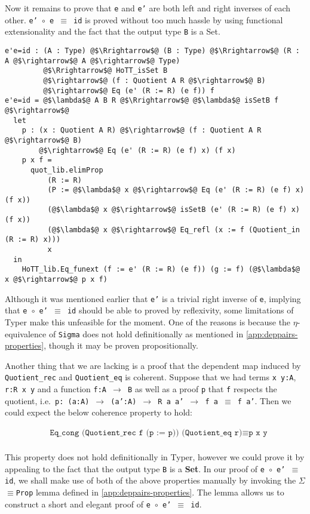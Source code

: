 \documentclass[12pt,twoside,maitrise]{dms}
\theoremstyle{definition}
\numberwithin{equation}{section}
\numberwithin{table}{chapter}
\numberwithin{figure}{chapter}
\newcommand\id[1] {\texttt{#1}}
\newcommand\fn[1] {\texttt{#1}}
\begin{document}
Now it remains to prove that \id{e} and \id{e'} are both left and right inverses
of each other. \fn{e' $\circ{}$ e $\equiv$ id} is proved without too much hassle
by using functional extensionality and the fact that the output type \id{B} is a
Set.

\begin{verbatim}
e'e=id : (A : Type) @$\Rrightarrow$@ (B : Type) @$\Rrightarrow$@ (R : A @$\rightarrow$@ A @$\rightarrow$@ Type)
         @$\Rrightarrow$@ HoTT_isSet B
         @$\rightarrow$@ (f : Quotient A R @$\rightarrow$@ B)
         @$\rightarrow$@ Eq (e' (R := R) (e f)) f
e'e=id = @$\lambda$@ A B R @$\Rrightarrow$@ @$\lambda$@ isSetB f @$\rightarrow$@
  let
    p : (x : Quotient A R) @$\rightarrow$@ (f : Quotient A R @$\rightarrow$@ B)
        @$\rightarrow$@ Eq (e' (R := R) (e f) x) (f x)
    p x f =
      quot_lib.elimProp
          (R := R)
          (P := @$\lambda$@ x @$\rightarrow$@ Eq (e' (R := R) (e f) x) (f x))
          (@$\lambda$@ x @$\rightarrow$@ isSetB (e' (R := R) (e f) x) (f x))
          (@$\lambda$@ x @$\rightarrow$@ Eq_refl (x := f (Quotient_in (R := R) x)))
          x
  in
    HoTT_lib.Eq_funext (f := e' (R := R) (e f)) (g := f) (@$\lambda$@ x @$\rightarrow$@ p x f)
\end{verbatim}

Although it was mentioned earlier that \id{e'} is a trivial right inverse of
\id{e}, implying that \fn{e $\circ{}$ e' $\equiv$ id} should be able to proved
by reflexivity, some limitations of Typer make this unfeasible for the moment.
One of the reasons is because the $\eta$-equivalence of \id{Sigma} does not hold
definitionally as mentioned in \autoref{app:deppairs-properties}, though it may
be proven propositionally.

Another thing that we are lacking is a proof that the dependent map induced by
\id{Quotient\_rec} and \id{Quotient\_eq} is coherent. Suppose that we had terms
\fn{x y:A}, \fn{r:R x y} and a function \fn{f:A $\rightarrow$ B} as well as a
proof \id{p} that \id{f} respects the quotient, i.e.\ \fn{p: (a:A) $\rightarrow$
  (a':A) $\rightarrow$ R a a' $\rightarrow$ f a $\equiv$ f a'}. Then we could
expect the below coherence property to hold:

\begin{align*}
  & \fn{Eq\_cong (Quotient\_rec f (p := p)) (Quotient\_eq r)} \equiv \fn{p x y} \\
\end{align*}

This property does not hold definitionally in Typer, however we could prove it
by appealing to the fact that the output type \id{B} is a \textbf{Set}. In our
proof of \fn{e $\circ{}$ e' $\equiv$ id}, we shall make use of both of the above
properties manually by invoking the \id{$\Sigma$$\equiv$Prop} lemma defined in
\autoref{app:deppairs-properties}. The lemma allows us to construct a short and
elegant proof of \fn{e $\circ{}$ e' $\equiv$ id}.
\end{document}
